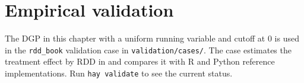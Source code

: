 \section{Empirical validation}

The DGP in this chapter with a uniform running variable and cutoff at 0 is
used in the \texttt{rdd_book} validation case in \texttt{validation/cases/}.
The case estimates the treatment effect by RDD in \hayashi{} and compares it
with R and Python reference implementations. Run \lstinline{hay validate} to
see the current status.

